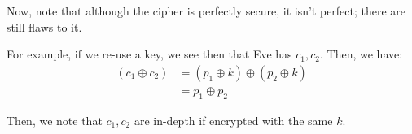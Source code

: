 \documentclass[openany]{book}
\begin{document}
Now, note that although the cipher is perfectly secure, it isn't perfect; there are still flaws to it.

For example, if we re-use a key, we see then that Eve has $c_1, c_2$. Then, we have:
\begin{align*}
	(c_1 \oplus c_2) &= (p_1 \oplus k) \oplus (p_2 \oplus k) \\
	&= p_1 \oplus p_2
\end{align*}

Then, we note that $c_1, c_2$ are in-depth if encrypted with the same $k$.
\end{document}
